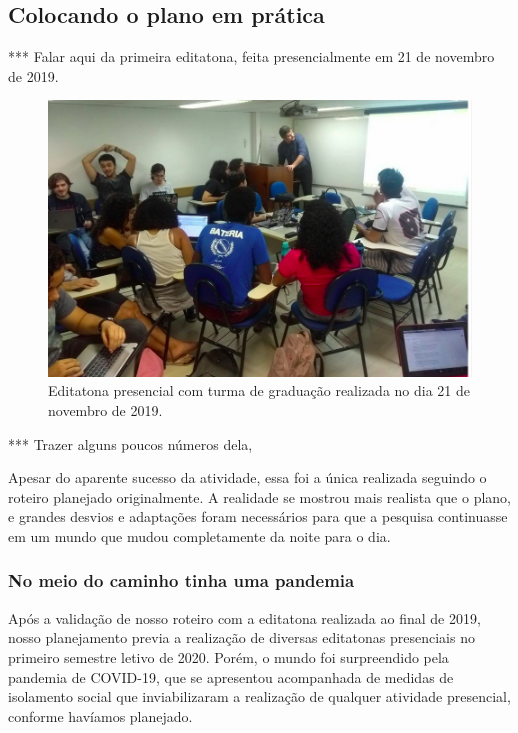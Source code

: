 \subsection{Colocando o plano em prática}

***  Falar aqui da primeira editatona, feita presencialmente em 21 de novembro de 2019.

\begin{figure}[H]
    \centering
    \includegraphics[width=1\textwidth]{Images/editatona_presencial.png}
    \caption{Editatona presencial com turma de graduação realizada no dia 21 de novembro de 2019.}
    \label{fig:editatona_presencial}
\end{figure}

***  Trazer alguns poucos números dela, 

Apesar do aparente sucesso da atividade, essa foi a única realizada seguindo o roteiro planejado originalmente. A realidade se mostrou mais realista que o plano, e grandes desvios e adaptações foram necessários para que a pesquisa continuasse em um mundo que mudou completamente da noite para o dia.

\subsubsection{No meio do caminho tinha uma pandemia}

Após a validação de nosso roteiro com a editatona realizada ao final de 2019, nosso planejamento previa a realização de diversas editatonas presenciais no primeiro semestre letivo de 2020. Porém, o mundo foi surpreendido pela pandemia de COVID-19, que se apresentou acompanhada de medidas de isolamento social que inviabilizaram a realização de qualquer atividade presencial, conforme havíamos planejado.

